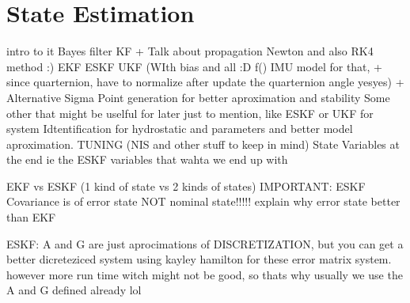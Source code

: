 \section{State Estimation}

intro to it
Bayes filter
KF + Talk about propagation Newton and also RK4 method :)
EKF
ESKF
UKF (WIth bias and all :D f() IMU model for that, + since quarternion, have to normalize after update the quarternion angle yesyes) + Alternative Sigma Point generation for better aproximation and stability
Some other that might be uselful for later just to mention, like ESKF or UKF for system Idtentification for hydrostatic and parameters and better model aproximation.
TUNING (NIS and other stuff to keep in mind)
State Variables at the end ie the ESKF variables that wahta we end up with


EKF vs ESKF (1 kind of state vs 2 kinds of states)
IMPORTANT: ESKF Covariance is of error state NOT nominal state!!!!!
explain why error state better than EKF


ESKF:
A and G are just aprocimations of DISCRETIZATION, but you can get a better dicreteziced system using kayley hamilton for these error matrix system. however more run time witch might not be good, so thats why usually we use the A and G defined already lol


